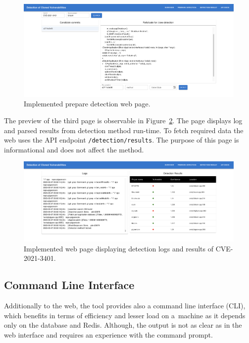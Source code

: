   \begin{figure}[h]
    \centering
    \includegraphics[width=1\textwidth]{obrazky-figures/cg_web_search.png}
    \caption{Implemented prepare detection web page.}
    \label{cg-impl-search}
  \end{figure}

  The preview of the third page is observable in Figure~\ref{cg-impl-results}. The page displays log and parsed results
  from detection method run-time. To fetch required data the web uses the API endpoint \texttt{/detection/results}. The purpose of this page is informational and does not affect the method.

  \begin{figure}[h]
    \centering
    \includegraphics[width=1\textwidth]{obrazky-figures/cg_web_results.png}
    \caption{Implemented web page displaying detection logs and results of CVE-2021-3401.}
    \label{cg-impl-results}
  \end{figure}

  \subsection*{Command Line Interface}
  Additionally to the web, the tool provides also a command line interface (CLI), which benefits in terms of efficiency
  and lesser load on a~machine as it depends only on the database and Redis. Although, the output is not as clear as in the web interface
  and requires an experience with the command prompt.

